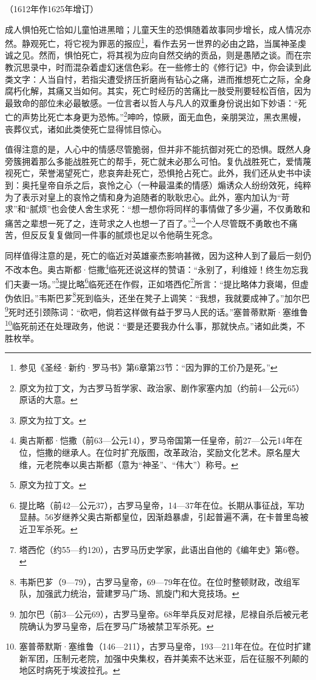 \begin{center}
    （1612年作1625年增订）
\end{center}
\par 成人惧怕死亡恰如儿童怕进黑暗；儿童天生的恐惧随着故事同步增长，成人情况亦然。静观死亡，将它视为罪恶的报应\footnote{参见《圣经·新约·罗马书》第6章第23节：“因为罪的工价乃是死。”}，看作去另一世界的必由之路，当属神圣虔诚之见。然而，惧怕死亡，将其视为应向自然交纳的贡品，则是愚陋之谈。而在宗教沉思录中，时而混杂着虚幻迷信色彩。在一些修士的《修行记》中，你会读到此类文字：人当自忖，若指尖遭受挤压折磨尚有钻心之痛，进而推想死亡之际，全身腐朽化解，其痛又当如何。其实，死亡时经历的苦痛比一肢受刑要轻松百倍，因为最致命的部位未必最敏感。一位言者以哲人与凡人的双重身份说出如下妙语：“死亡的声势比死亡本身更为恐怖。”\footnote{原文为拉丁文，为古罗马哲学家、政治家、剧作家塞内加（约前4—公元65）原话的大意。}呻吟，惊厥，面无血色，亲朋哭泣，黑衣黑幔，丧葬仪式，诸如此类使死亡显得怵目惊心。
\par 值得注意的是，人心中的情感尽管脆弱，但并非不能抗御对死亡的恐惧。既然人身旁簇拥着那么多能战胜死亡的帮手，死亡就未必那么可怕。复仇战胜死亡，爱情蔑视死亡，荣誉渴望死亡，悲哀奔赴死亡，恐惧抢占死亡。此外，我们还从史书中读到：奥托皇帝自杀之后，哀怜之心（一种最温柔的情感）煽诱众人纷纷效死，纯粹为了表示对皇上的哀怜之情和身为追随者的耿耿忠心。此外，塞内加认为“苛求”和“腻烦”也会使人舍生求死：“想一想你将同样的事情做了多少遍，不仅勇敢和痛苦之辈想一死了之，连苛求之人也想一了百了。”\footnote{原文为拉丁文。}一个人尽管既不勇敢也不痛苦，但反反复复做同一件事的腻烦也足以令他萌生死念。
\par 同样值得注意的是，死亡的临近对英雄豪杰影响甚微，因为这种人到了最后一刻仍不改本色。奥古斯都·恺撒\footnote{奥古斯都·恺撒（前63—公元14），罗马帝国第一任皇帝，前27—公元14年在位，恺撒的继承人。在位时扩充版图，改革政治，奖励文化艺术。原名屋大维，元老院奉以奥古斯都（意为“神圣”、“伟大”）称号。}临死还说这样的赞语：“永别了，利维娅！终生勿忘我们夫妻一场。”\footnote{原文为拉丁文。}提比略\footnote{提比略（前42—公元37），古罗马皇帝，14—37年在位。长期从事征战，军功显赫。56岁继养父奥古斯都皇位，因渐趋暴虐，引起普遍不满，在卡普里岛被近卫军杀死。}临死还在作假，正如塔西佗\footnote{塔西佗（约55—约120），古罗马历史学家，此语出自他的《编年史》第6卷。}所言：“提比略体力衰竭，但虚伪依旧。”韦斯巴芗\footnote{韦斯巴芗（9—79），古罗马皇帝，69—79年在位。在位时整顿财政，改组军队，加强武力统治，营建罗马广场、凯旋门和大竞技场。}死到临头，还坐在凳子上调笑：“我想，我就要成神了。”加尔巴\footnote{加尔巴（前3—公元69），古罗马皇帝。68年举兵反对尼禄，尼禄自杀后被元老院确认为罗马皇帝，后在罗马广场被禁卫军杀死。}死时还引颈陈词：“砍吧，倘若这样做有益于罗马人民的话。”塞普蒂默斯·塞维鲁\footnote{塞普蒂默斯·塞维鲁（146—211），古罗马皇帝，193—211年在位。在位时扩建新军团，压制元老院，加强中央集权，吞并美索不达米亚，后在征服不列颠的地区时病死于埃波拉孔。}临死前还在处理政务，他说：“要是还要我办什么事，那就快点。”诸如此类，不胜枚举。
